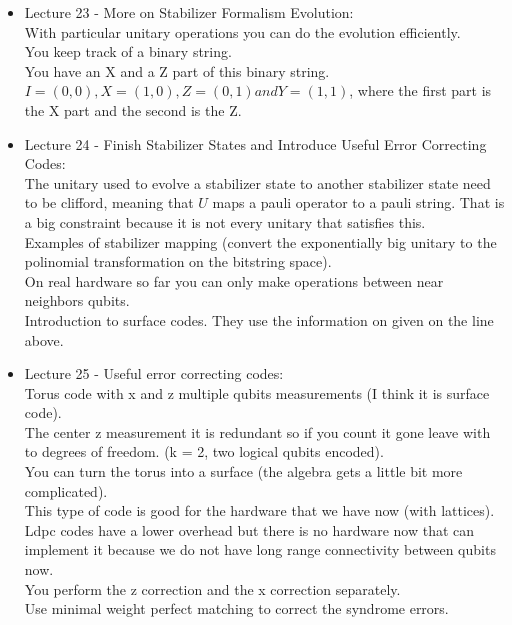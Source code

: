 \documentclass{article}
\begin{document}
\begin{itemize}
    \item {Lecture 23 - More on Stabilizer Formalism Evolution:}\\
    With particular unitary operations you can do the evolution efficiently. \\
    You keep track of a binary string.\\
    You have an X and a Z part of this binary string. $I = (0,0), X = (1,0), Z = (0,1) and Y = (1,1)$, where the first part is the X part and the second is the Z.\\

    \item {Lecture 24 - Finish Stabilizer States and Introduce Useful Error Correcting Codes:}\\
    The unitary used to evolve a stabilizer state to another stabilizer state need to be clifford, meaning that $U$ maps a pauli operator to a pauli string. That is a big constraint because it is not every unitary that satisfies this.\\    
    Examples of stabilizer mapping (convert the exponentially big unitary to the polinomial transformation on the bitstring space).\\
    On real hardware so far you can only make operations between near neighbors qubits.\\
    Introduction to surface codes. They use the information on given on the line above.\\

    \item {Lecture 25 - Useful error correcting codes:}\\
    Torus code with x and z multiple qubits measurements (I think it is surface code).\\
    The center z measurement it is redundant so if you count it gone leave with to degrees of freedom. (k = 2, two logical qubits encoded).\\
    You can turn the torus into a surface (the algebra gets a little bit more complicated).\\
    This type of code is good for the hardware that we have now (with lattices).\\
    Ldpc codes have a lower overhead but there is no hardware now that can implement it because we do not have long range connectivity between qubits now.\\
    You perform the z correction and the x correction separately.\\
    Use minimal weight perfect matching to correct the syndrome errors.\\


\end{itemize}
\end{document}

